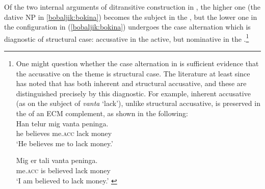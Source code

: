 \documentclass[output=paper]{langsci/langscibook}
\begin{document}
\noindent Of the two internal arguments of ditransitive construction in , the higher one (the dative NP in \ref{bobaljik:bokina}) becomes the subject in the , but the lower one in the configuration in (\ref{bobaljik:bokina}) undergoes the case alternation which is diagnostic of structural case: accusative in the active, but nominative in the .\footnote{\label{bobaljik:larsonq}One might question whether the case alternation in  is sufficient evidence that the accusative on the theme is structural case. The literature at least since \citet{Andrews1982} has noted that  has both inherent and structural accusative, and these are distinguished precisely by this diagnostic. For example, inherent accusative (as on the subject of  \textit{vanta} `lack'), unlike structural accusative, is preserved in the  of an ECM complement, as shown in the following:\\

\eafirst
 \gll Han telur mig vanta peninga. \\
he believes me.\textsc{acc} lack money \\  
\glt `He believes me to lack money.'
\z

\ea \gll Mig er tali{\dh} vanta peninga. \\
me.\textsc{acc} is believed lack money \\
\glt `I am believed to lack money.' \citep{Andrews1982}
\zlast
}
\end{document}
